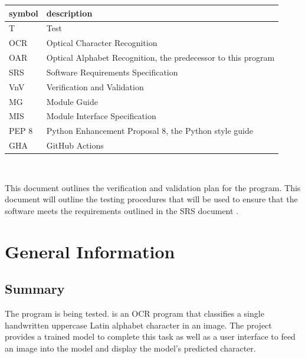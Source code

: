\documentclass[12pt, titlepage]{article}
\begin{document}
\renewcommand{\arraystretch}{1.2}
\begin{tabular}{l l} 
  \toprule		
  \textbf{symbol} & \textbf{description}\\
  \midrule 
  T & Test\\
  OCR & Optical Character Recognition\\
  OAR & Optical Alphabet Recognition, the predecessor to this program\\
  SRS & Software Requirements Specification\\
  VnV & Verification and Validation\\
  MG & Module Guide\\
  MIS & Module Interface Specification\\
  PEP 8 & Python Enhancement Proposal 8, the Python style guide\\
  GHA & GitHub Actions\\
  \bottomrule
\end{tabular}\\



\newpage


This document outlines the verification and validation plan for the \progname{}
program. This document will outline the testing procedures that will be used to
ensure that the software meets the requirements outlined in the SRS document \citep{SRS}.

\section{General Information}

\subsection{Summary}

The \progname{} program is being tested. \progname{} is an OCR program that classifies
a single handwritten uppercase Latin alphabet character in an image. The project
provides a trained model to complete this task as well as a user interface to
feed an image into the model and display the model's predicted character.

\end{document}
